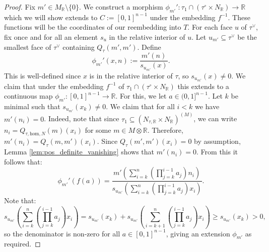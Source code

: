 \documentclass[11pt]{amsart}
\theoremstyle{definition}
\theoremstyle{remark}
\def\hom{\mathrm{hom}}
\begin{document}
\begin{proof}
	Fix $m'\in M_{\mathbb{R}}\setminus \{0\}$. We construct a morphism $\phi_{m'}':\tau_1\cap (\tau^{\circ}\times N_{\mathbb{R}})\to \mathbb{R}$
	which we will show extends to $C:=[0,1]^{n-1}$ under the embedding $f^{-1}$. These functions will be the coordinates of our reembedding
	into $T$. For each face $u$ of $\tau^{\vee}$, fix once and for all an element $s_{u}$ in the relative interior of $u$.
	Let $u_{m'}\subseteq \tau^{\vee}$ be the smallest face of $\tau^{\vee}$ containing $Q_{\tau}(m',m')$. Define
	$$\phi_{m'}'(x,n):=\frac{m'(n)}{s_{u_{m'}}(x)}.$$
	This is well-defined since $x$ is in the relative interior of $\tau$, so $s_{u_{m'}}(x)\neq 0$. We claim that under the
	embedding $f^{-1}$ of $\tau_1\cap (\tau^{\circ}\times N_{\mathbb{R}})$ this extends to a continuous map $\phi_{m'}:[0,1]^{n-1}\to \mathbb{R}$.
	For this, we let $a\in (0,1]^{n-1}$. Let $k$ be minimal such that $s_{u_{m'}}(x_k)\neq 0$. We claim that for all $i<k$ we
	have $m'(n_i)=0$. Indeed, note that since $\tau_1\subseteq (N_{\tau,\mathbb{R}}\times N_{\mathbb{R}})^{(M)}$, we can write
	$n_i=Q_{\tau,\hom,N}(m)(x_i)$ for some $m\in M\otimes \mathbb{R}$. Therefore, $m'(n_i)=Q_{\tau}(m,m')(x_i)$. Since $Q_{\tau}(m',m')(x_i)=0$ by assumption,
	Lemma \ref{lem:pos_definite_vanishing} shows that $m'(n_i)=0$. From this it follows that:
	$$\phi_{m'}'(f(a))=\frac{m'\left(\sum_{i=k}^{n}\left(\prod_{j=k}^{i-1}a_j\right)n_i\right)}{s_{u_{m'}}\left(\sum_{i=k}^{n}\left(\prod_{j=k}^{i-1}a_j\right)x_i\right)}.$$
	Note that:
	$$s_{u_{m'}}\left(\sum_{i=k}^{n}\left(\prod_{j=k}^{i-1}a_j\right)x_i\right)=s_{u_{m'}}(x_k)+s_{u_{m'}}\left(\sum_{i=k+1}^{n}\left(\prod_{j=k}^{i-1}a_j\right)x_i\right)\ge s_{u_{m'}}(x_k)>0,$$
	so the denominator is non-zero for all $a\in [0,1]^{n-1}$, giving an extension $\phi_{m'}$ as required.


\end{proof}
\end{document}
